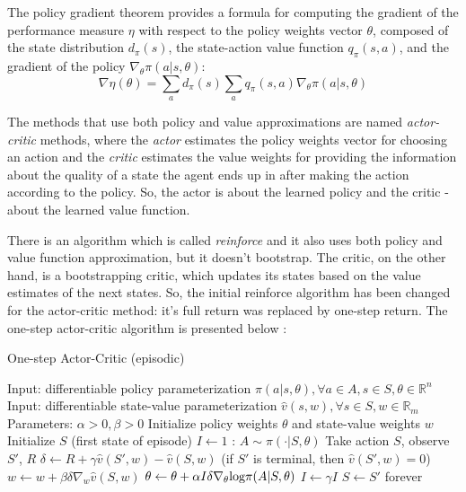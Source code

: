 The policy gradient theorem provides a formula for computing the gradient of the performance measure $\eta$ with respect to the policy weights vector $\theta$, composed of the state distribution $d_{\pi}(s)$, the state-action value function $q_{\pi}(s,a)$, and the gradient of the policy $\nabla_{\theta}\pi(a|s,\theta)$:
\begin{equation}\label{gradMTheorem}
\nabla\eta(\theta)=\sum_{a}d_{\pi}(s)\sum_{a}q_{\pi}(s,a)\nabla_{\theta}\pi(a|s,\theta)
\end{equation}

The methods that use both policy and value approximations are named \textit{actor-critic} methods, where the \textit{actor} estimates the policy weights vector for choosing an action and the \textit{critic} estimates the value weights for providing the information about the quality of a state the agent ends up in after making the action according to the policy. So, the actor is about the learned policy and the critic - about the learned value function. 

There is an algorithm which is called \textit{reinforce} and it also uses both policy and value function approximation, but it doesn't bootstrap. The critic, on the other hand, is a bootstrapping critic, which updates its states based on the value estimates of the next states. So, the initial reinforce algorithm has been changed for the actor-critic method: it's full return was replaced by one-step return. The one-step actor-critic algorithm is presented below \cite{Sutton}:
\begin{algorithm}[H]
	\caption{One-step Actor-Critic (episodic)}
	\label{algo:AC}
	\begin{algorithmic}
		\State Input: differentiable policy parameterization $\pi(a|s,\theta),\forall a\in A, s\in S,\theta\in\mathbb{R}^{n}$
		\State Input: differentiable state-value parameterization $\hat{v}(s,w),\forall s \in S, w \in \mathbb{R}_{m}$
		\State Parameters: $\alpha>0,\beta>0$
		\State Initialize policy weights $\theta$ and state-value weights $w$
		\Repeat
		\State Initialize $S$ (first state of episode)
		\State $I\leftarrow 1$
		:
		\State $A\sim \pi(\cdot|S,\theta)$
		\State Take action $S$, observe $S'$, $R$
		\State $\delta\leftarrow R+\gamma\hat{v}(S',w)-\hat{v}(S,w)$ (if $S'$ is terminal, then $\hat{v}(S',w)=0$)
		\State $w\leftarrow w+\beta\delta\nabla_{w}\hat{v}(S,w)$
		\State $\theta\leftarrow \theta+\alpha I \delta\nabla_{\theta} \textup{log} \pi(A|S,\theta)$
		\State $I\leftarrow \gamma I$
		\State $S\leftarrow S'$
		\EndWhile
		\Until forever
	\end{algorithmic}
\end{algorithm}

